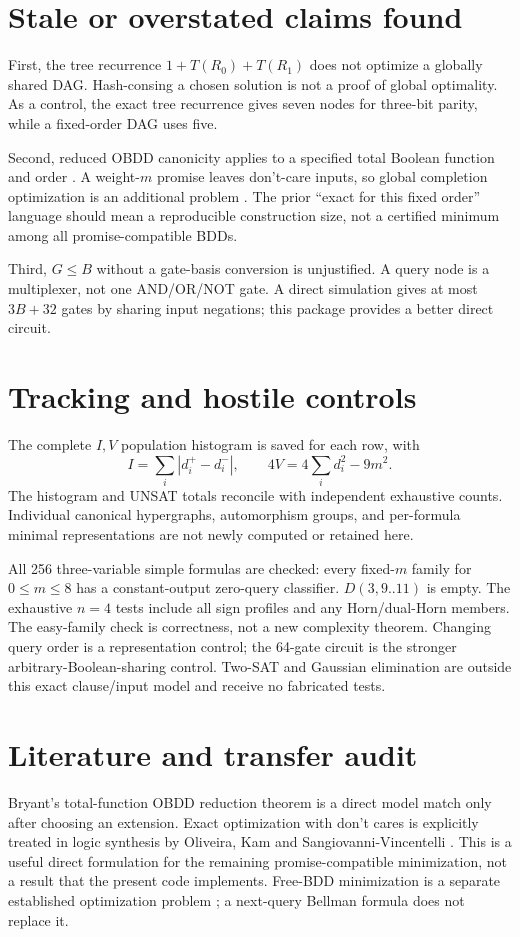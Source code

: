\documentclass[11pt]{article}
\begin{document}
\section*{Stale or overstated claims found}
First, the tree recurrence $1+T(R_0)+T(R_1)$ does not optimize a globally shared
DAG. Hash-consing a chosen solution is not a proof of global optimality.
As a control, the exact tree recurrence gives seven nodes for three-bit parity,
while a fixed-order DAG uses five.

Second, reduced OBDD canonicity applies to a specified total Boolean function
and order \cite{bryant}. A weight-$m$ promise leaves don't-care inputs, so global
completion optimization is an additional problem \cite{oliveira}.
The prior ``exact for this fixed order'' language should mean a reproducible
construction size, not a certified minimum among all promise-compatible BDDs.

Third, $G\le B$ without a gate-basis conversion is unjustified. A query node is a
multiplexer, not one AND/OR/NOT gate. A direct simulation gives at most $3B+32$
gates by sharing input negations; this package provides a better direct circuit.

\section*{Tracking and hostile controls}
The complete $I,V$ population histogram is saved for each row, with
\[
I=\sum_i|d_i^+-d_i^-|,\qquad
4V=4\sum_i d_i^2-9m^2.
\]
The histogram and UNSAT totals reconcile with independent exhaustive counts.
Individual canonical hypergraphs, automorphism groups, and per-formula minimal
representations are not newly computed or retained here.

All 256 three-variable simple formulas are checked: every fixed-$m$ family for
$0\le m\le8$ has a constant-output zero-query classifier. $D(3,9..11)$ is empty.
The exhaustive $n=4$ tests include all sign profiles and any Horn/dual-Horn
members. The easy-family check is correctness, not a new complexity theorem.
Changing query order is a representation control; the 64-gate circuit is the
stronger arbitrary-Boolean-sharing control. Two-SAT and Gaussian elimination
are outside this exact clause/input model and receive no fabricated tests.

\section*{Literature and transfer audit}
Bryant's total-function OBDD reduction theorem is a direct model match only
after choosing an extension. Exact optimization with don't cares is explicitly
treated in logic synthesis by Oliveira, Kam and Sangiovanni-Vincentelli
\cite{oliveira}. This is a useful direct formulation for the remaining
promise-compatible minimization, not a result that the present code implements.
Free-BDD minimization is a separate established optimization problem
\cite{gunther}; a next-query Bellman formula does not replace it.
\end{document}
